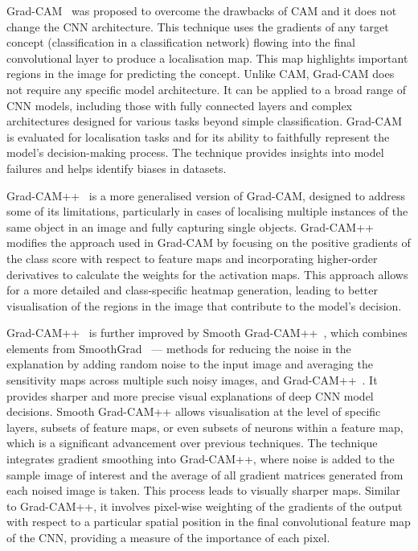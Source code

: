 Grad-CAM~\cite{SelvarajuCDVPB20} was proposed to overcome the drawbacks of CAM and it does not change the CNN architecture. This technique uses the gradients of any target concept (\ie classification in a classification network) flowing into the final convolutional layer to produce a localisation map. This map highlights important regions in the image for predicting the concept. Unlike CAM, Grad-CAM does not require any specific model architecture. It can be applied to a broad range of CNN models, including those with fully connected layers and complex architectures designed for various tasks beyond simple classification. Grad-CAM is evaluated for localisation tasks and for its ability to faithfully represent the model's decision-making process. The technique provides insights into model failures and helps identify biases in datasets.

Grad-CAM++~\cite{ChattopadhyaySH18} is a more generalised version of Grad-CAM, designed to address some of its limitations, particularly in cases of localising multiple instances of the same object in an image and fully capturing single objects. Grad-CAM++ modifies the approach used in Grad-CAM by focusing on the positive gradients of the class score with respect to feature maps and incorporating higher-order derivatives to calculate the weights for the activation maps. This approach allows for a more detailed and class-specific heatmap generation, leading to better visualisation of the regions in the image that contribute to the model's decision.


Grad-CAM++~\cite{ChattopadhyaySH18} is further improved by Smooth Grad-CAM++~\cite{abs-1908-01224}, which combines elements from SmoothGrad~\cite{SmilkovTKVW17} --- methods for reducing the noise in the explanation by adding random noise to the input image and averaging the sensitivity maps across multiple such noisy images, and Grad-CAM++~\cite{ChattopadhyaySH18}. It provides sharper and more precise visual explanations of deep CNN model decisions. Smooth Grad-CAM++ allows visualisation at the level of specific layers, subsets of feature maps, or even subsets of neurons within a feature map, which is a significant advancement over previous techniques. The technique integrates gradient smoothing into Grad-CAM++, where noise is added to the sample image of interest and the average of all gradient matrices generated from each noised image is taken. This process leads to visually sharper maps. Similar to Grad-CAM++, it involves pixel-wise weighting of the gradients of the output with respect to a particular spatial position in the final convolutional feature map of the CNN, providing a measure of the importance of each pixel.

